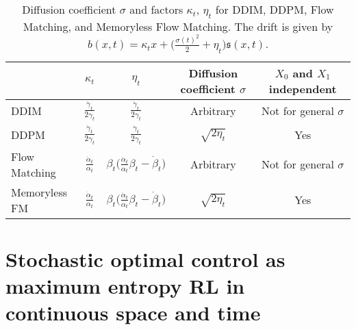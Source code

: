 \documentclass[]{fairmeta}
\begin{document}
\begin{table}[h]
\centering
\begin{tabular}{lcccc}
    \toprule
     & $\kappa_t$ & $\eta_t$ & Diffusion coefficient $\sigma$ & $X_0$ and $X_1$ independent \\
    \midrule
    DDIM & 
    $\frac{\dot{\gamma}_{t}}{2\gamma_{t}}$
    & 
    $\frac{\dot{\gamma}_{t}}{2\gamma_{t}}$
    & Arbitrary & Not for general $\sigma$ \\
    \addlinespace
    DDPM & 
    $\frac{\dot{\gamma}_{t}}{2\gamma_{t}}$
    & 
    $\frac{\dot{\gamma}_{t}}{2\gamma_{t}}$
    & $\sqrt{2\eta_t}$ & Yes \\
    \addlinespace
    Flow Matching & $\frac{\dot{\alpha}_t}{\alpha_t}$ & $\beta_t \big(\frac{\dot{\alpha}_t}{\alpha_t} \beta_t - \dot{\beta}_t\big)$ & Arbitrary & Not for general $\sigma$ \\
    \addlinespace
    Memoryless FM & $\frac{\dot{\alpha}_t}{\alpha_t}$ & $\beta_t \big(\frac{\dot{\alpha}_t}{\alpha_t} \beta_t - \dot{\beta}_t\big)$ & $\sqrt{2\eta_t}$ & Yes \\
    \bottomrule
\end{tabular}
\caption{Diffusion coefficient $\sigma$ and factors $\kappa_t$, $\eta_t$ for DDIM, DDPM, Flow Matching, and Memoryless Flow Matching. The drift is given by $ b(x,t) = \kappa_t x + \big(\frac{\sigma(t)^2}{2} + \eta_t\big) \mathfrak{s}(x,t)$. 
}
\label{table:coefficients}
\end{table}

 

\section{Stochastic optimal control as maximum entropy RL in continuous space and time}
\label{subsec:max_ent_RL}
\end{document}
